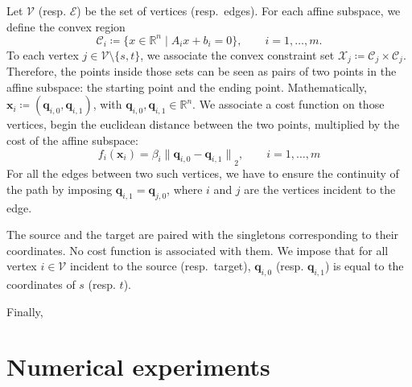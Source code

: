 \documentclass[a4paper, 12pt]{article}
\begin{document}
Let $\mathcal{V}$ (resp. $\mathcal{E}$) be the set of vertices (resp.~edges). For each affine subspace, we define the convex region \[\mathcal{C}_i \coloneq \{x \in \mathbb{R}^n \mid A_i x + b_i = 0\}, \qquad i = 1, \dots, m.\]
To each vertex $j \in \mathcal{V}\setminus\{s, t\}$, we associate the convex constraint set $\mathcal{X}_j \coloneq \mathcal{C}_j \times \mathcal{C}_j$. Therefore, the points inside those sets can be seen as pairs of two points in the affine subspace: the starting point and the ending point. Mathematically, $\mathbf{x}_i \coloneq (\mathbf{q}_{i,0}, \mathbf{q}_{i,1})$, with $\mathbf{q}_{i,0}, \mathbf{q}_{i,1} \in \mathbb{R}^n$. We associate a cost function on those vertices, begin the euclidean distance between the two points, multiplied by the cost of the affine subspace: \[f_i(\mathbf{x}_i) = \beta_i {\lVert \mathbf{q}_{i,0} - \mathbf{q}_{i,1} \rVert}_2, \qquad i = 1, \dots, m\]
For all the edges between two such vertices, we have to ensure the continuity of the path by imposing $\mathbf{q}_{i,1} = \mathbf{q}_{j,0}$, where $i$ and $j$ are the vertices incident to the edge.

The source and the target are paired with the singletons corresponding to their coordinates. No cost function is associated with them. We impose that for all vertex $i \in \mathcal{V}$ incident to the source (resp.~target), $\mathbf{q}_{i,0}$ (resp. $\mathbf{q}_{i,1}$) is equal to the coordinates of $s$ (resp. $t$).

Finally, 

\section{Numerical experiments}\label{sec:experiments}

\printbibliography{}
\end{document}
